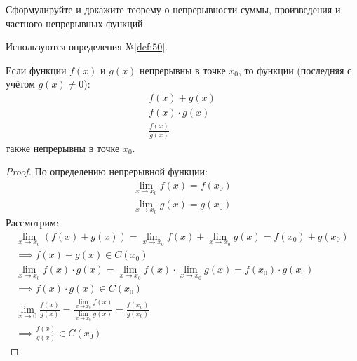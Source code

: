 \begin{question}
    Сформулируйте и докажите теорему о непрерывности суммы, произведения и частного непрерывных функций.
\end{question}
\begin{used}
    Используются определения №\ref{def:50}.
\end{used}
\begin{theorem}
  Если функции $f(x)$ и $g(x)$ непрерывны в точке $x_0$, то функции (последняя с учётом $g(x) \neq 0$):   
  \begin{gather*}
    f(x) + g(x) \\
    f(x) \cdot g(x) \\
    \frac{f(x)}{g(x)}
  \end{gather*}
  также непрерывны в точке $x_0$. 
\end{theorem}
\begin{proof}
    По определению непрерывной функции: 
    \begin{gather*}
        \lim_{x \to x_0} f(x) = f(x_0) \\
        \lim_{x \to x_0} g(x) = g(x_0)
    \end{gather*}
    Рассмотрим:
    \begin{gather*}
        \lim_{x \to x_0} (f(x) + g(x)) = \lim_{x \to x_0} f(x) + \lim_{x \to x_0} g(x) = f(x_0) + g(x_0)
        \\
        \implies f(x) + g(x) \in C(x_0) 
        \\
        \lim_{x \to x_0} f(x) \cdot g(x) = \lim_{x \to x_0} f(x) \cdot \lim_{x \to x_0} g(x) = f(x_0) \cdot g(x_0) 
        \\
        \implies f(x) \cdot g(x) \in C(x_0)
        \\
        \lim_{x \to 0} \frac{f(x)}{g(x)} = \frac{\lim_{x \to x_0} f(x)}{\lim_{x \to x_0} g(x)} = \frac{f(x_0)}{g(x_0)}
        \\
        \implies \frac{f(x)}{g(x)} \in C(x_0)
    \end{gather*}
\end{proof}
\pagebreak



